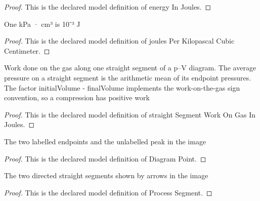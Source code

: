 \begin{proof}
  This is the declared model definition of energy In Joules.
\end{proof}
\begin{definition}
  \label{def:physics:phyx-mini-0402:phyxminiproblems-problemphyxmini0402-joulesperkilopascalcubiccentimeter}
  One kPa · cm³ is 10⁻³ J
\end{definition}
\begin{proof}
  This is the declared model definition of joules Per Kilopascal Cubic Centimeter.
\end{proof}
\begin{definition}
  \label{def:physics:phyx-mini-0402:phyxminiproblems-problemphyxmini0402-straightsegmentworkongasinjoules}
  Work done on the gas along one straight segment of a p--V diagram. The average pressure on a straight segment is the arithmetic mean of its endpoint pressures. The factor initialVolume - finalVolume implements the work-on-the-gas sign convention, so a compression has positive work
\end{definition}
\begin{proof}
  This is the declared model definition of straight Segment Work On Gas In Joules.
\end{proof}
\begin{definition}
  \label{def:physics:phyx-mini-0402:phyxminiproblems-problemphyxmini0402-diagrampoint}
  The two labelled endpoints and the unlabelled peak in the image
\end{definition}
\begin{proof}
  This is the declared model definition of Diagram Point.
\end{proof}
\begin{definition}
  \label{def:physics:phyx-mini-0402:phyxminiproblems-problemphyxmini0402-processsegment}
  The two directed straight segments shown by arrows in the image
\end{definition}
\begin{proof}
  This is the declared model definition of Process Segment.
\end{proof}
